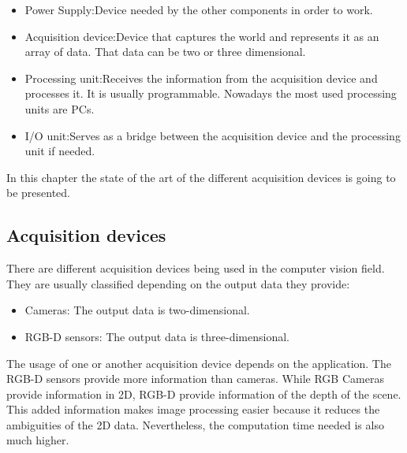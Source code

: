 \begin{itemize}
	\item{Power Supply:}Device needed by the other components in order to work. 
	\item{Acquisition device:}Device that captures the world and represents it as an array of data. That data can be two or three dimensional. 
	\item{Processing unit:}Receives the information from the acquisition device and processes it. It is usually programmable. Nowadays the most used processing units are PCs. 
	\item{I/O unit:}Serves as a bridge between the acquisition device and the processing unit if needed. 

\end{itemize}

In this chapter the state of the art of the different acquisition devices is going to be presented. 

\subsection{Acquisition devices}
There are different acquisition devices being used in the computer vision field. 
They are usually classified depending on the output data they provide: 

\begin{itemize}
	\item{Cameras:}	The output data is two-dimensional. 
	\item{RGB-D sensors:} The output data is three-dimensional. 
\end{itemize}

The usage of one or another acquisition device depends on the application. 
The RGB-D sensors provide more information than cameras. 
While RGB Cameras provide information in 2D, RGB-D provide information of the depth of the scene.
This added information makes image processing easier because it reduces the ambiguities of the 2D data. 
Nevertheless, the computation time needed is also much higher. 


